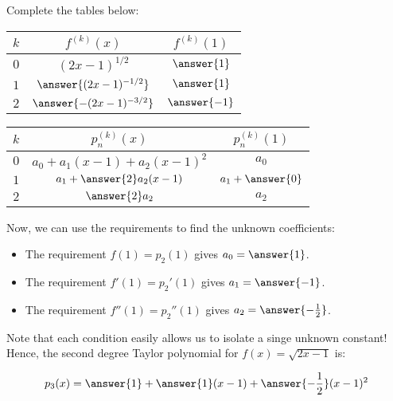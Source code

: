 \documentclass{ximera}
\begin{document}
\begin{exercise}
\begin{exercise}
\begin{exercise}
Complete the tables below:

\begin{tabular}{|c||c|c|}
\hline
$k$ \quad & \quad \quad $f^{(k)}(x)$  \quad \quad & \quad \quad $f^{(k)}(1)$ \quad \quad \\
\hline 
$0$ \quad & \quad \quad $(2x-1)^{1/2}$  \quad \quad & \quad \quad $\answer{1}$ \quad \quad  \\
\hline
$1$ \quad & \quad \quad $\answer{(2x-1)^{-1/2}}$ \quad \quad & \quad \quad $\answer{1}$ \quad \quad \\
\hline
$2$ \quad & \quad \quad $\answer{-(2x-1)^{-3/2}}$ \quad \quad & \quad \quad $\answer{-1}$ \quad \quad \\
\hline 
\end{tabular}

\begin{tabular}{|c||c|c|}
\hline
$k$ \quad & \quad \quad $p_n^{(k)}(x)$  \quad \quad & \quad \quad $p_n^{(k)}(1)$ \quad \quad \\
\hline 
$0$ \quad & \quad \quad $a_0+a_1(x-1)+a_2(x-1)^2$  \quad \quad & \quad \quad $a_0$ \quad \quad  \\
\hline
$1$ \quad & \quad \quad $a_1+\answer{2}a_2(x-1)$ \quad \quad & \quad \quad $a_1+\answer{0}$ \quad \quad \\
\hline
$2$ \quad & \quad \quad $\answer{2}a_2$ \quad \quad & \quad \quad $a_2$ \quad \quad \\
\hline
\end{tabular}

\begin{exercise}
Now, we can use the requirements to find the unknown coefficients:

\begin{itemize}
\item The requirement $f(1) = p_2(1)$ gives $a_0 = \answer{1}$. 
\item The requirement $f'(1) = p_2'(1)$ gives $a_1 = \answer{-1}$. 
\item The requirement $f''(1) = p_2''(1)$ gives $a_2 = \answer{-\frac{1}{2}}$. 
\end{itemize}

Note that each condition easily allows us to isolate a singe unknown constant!  Hence, the second degree Taylor polynomial for $f(x) =\sqrt{2x-1}$ is:

\begin{align*}
p_3(x) &= \answer{1}+\answer{1}(x-1)+\answer{-\frac{1}{2}}(x-1)^2\\
\end{align*}
\end{exercise}
\end{exercise}


\end{exercise}
\end{exercise}
\end{document}
